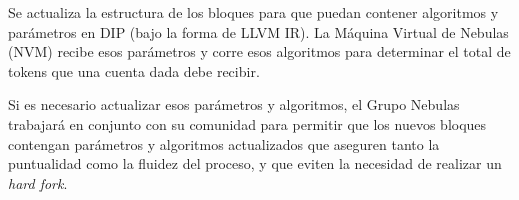 Se actualiza la estructura de los bloques para que puedan contener algoritmos y parámetros en DIP (bajo la forma de LLVM IR). La Máquina Virtual de Nebulas (NVM) recibe esos parámetros y corre esos algoritmos para determinar el total de tokens que una cuenta dada debe recibir.

Si es necesario actualizar esos parámetros y algoritmos, el Grupo Nebulas trabajará en conjunto con su comunidad para permitir que los nuevos bloques contengan parámetros y algoritmos actualizados que aseguren tanto la puntualidad como la fluidez del proceso, y que eviten la necesidad de realizar un \textit{hard fork}.